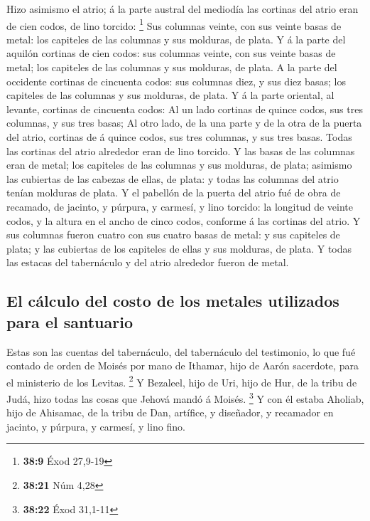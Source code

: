  Hizo asimismo el atrio; á la parte austral del mediodía
las cortinas del atrio eran de cien codos, de lino torcido: \footnote{\textbf{38:9}
  Éxod 27,9-19}  Sus columnas veinte, con sus veinte
basas de metal: los capiteles de las columnas y sus molduras, de plata.
 Y á la parte del aquilón cortinas de cien codos: sus
columnas veinte, con sus veinte basas de metal; los capiteles de las
columnas y sus molduras, de plata.  A la parte del
occidente cortinas de cincuenta codos: sus columnas diez, y sus diez
basas; los capiteles de las columnas y sus molduras, de plata.
 Y á la parte oriental, al levante, cortinas de cincuenta
codos:  Al un lado cortinas de quince codos, sus tres
columnas, y sus tres basas;  Al otro lado, de la una
parte y de la otra de la puerta del atrio, cortinas de á quince codos,
sus tres columnas, y sus tres basas.  Todas las cortinas
del atrio alrededor eran de lino torcido.  Y las basas de
las columnas eran de metal; los capiteles de las columnas y sus
molduras, de plata; asimismo las cubiertas de las cabezas de ellas, de
plata: y todas las columnas del atrio tenían molduras de plata.
 Y el pabellón de la puerta del atrio fué de obra de
recamado, de jacinto, y púrpura, y carmesí, y lino torcido: la longitud
de veinte codos, y la altura en el ancho de cinco codos, conforme á las
cortinas del atrio.  Y sus columnas fueron cuatro con sus
cuatro basas de metal: y sus capiteles de plata; y las cubiertas de los
capiteles de ellas y sus molduras, de plata.  Y todas las
estacas del tabernáculo y del atrio alrededor fueron de metal.

\hypertarget{el-cuxe1lculo-del-costo-de-los-metales-utilizados-para-el-santuario}{%
\subsection{El cálculo del costo de los metales utilizados para el
santuario}\label{el-cuxe1lculo-del-costo-de-los-metales-utilizados-para-el-santuario}}

 Estas son las cuentas del tabernáculo, del tabernáculo
del testimonio, lo que fué contado de orden de Moisés por mano de
Ithamar, hijo de Aarón sacerdote, para el ministerio de los Levitas.
\footnote{\textbf{38:21} Núm 4,28}  Y Bezaleel, hijo de
Uri, hijo de Hur, de la tribu de Judá, hizo todas las cosas que Jehová
mandó á Moisés. \footnote{\textbf{38:22} Éxod 31,1-11}  Y
con él estaba Aholiab, hijo de Ahisamac, de la tribu de Dan, artífice, y
diseñador, y recamador en jacinto, y púrpura, y carmesí, y lino fino.

